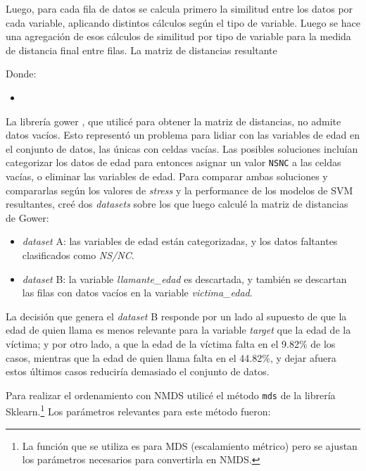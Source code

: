 \documentclass[10 pt]{article}
\begin{document}
Luego, para cada fila de datos se calcula primero la similitud entre los datos por cada variable, aplicando distintos cálculos según el tipo de variable. Luego se hace una agregación de esos cálculos de similitud por tipo de variable para la medida de distancia final entre filas. La matriz de distancias resultante


Donde:
\begin{itemize}
    \item 
\end{itemize}



La librería gower , que utilicé para obtener la matriz de distancias, no admite datos vacíos. Esto representó un problema para lidiar con las variables de edad en el conjunto de datos, las únicas con celdas vacías. Las posibles soluciones incluían categorizar los datos de edad para entonces asignar un valor \texttt{NSNC} a las celdas vacías, o eliminar las variables de edad. Para comparar ambas soluciones y compararlas según los valores de \textit{stress} y la performance de los modelos de SVM resultantes, creé dos \textit{datasets} sobre los que luego calculé la matriz de distancias de Gower: 
\begin{itemize}
    \item \textit{dataset} A: las variables de edad están categorizadas, y los datos faltantes clasificados como \textit{NS/NC}.
    \item  \textit{dataset} B: la variable \textit{llamante\_edad} es descartada, y también se descartan las filas con datos vacíos en la variable \textit{victima\_edad}.
\end{itemize}

La decisión que genera el \textit{dataset} B responde por un lado al supuesto de que la edad de quien llama es menos relevante para la variable \textit{target} que la edad de la víctima; y por otro lado, a que la edad de la víctima falta en el 9.82\% de los casos, mientras que la edad de quien llama falta en el 44.82\%, y dejar afuera estos últimos casos reduciría demasiado el conjunto de datos. 


Para realizar el ordenamiento con NMDS utilicé el método \texttt{mds} de la librería Sklearn.\footnote{La función que se utiliza es para MDS (escalamiento métrico) pero se ajustan los parámetros necesarios para convertirla en NMDS.} Los parámetros relevantes para este método fueron:
 
\end{document}
